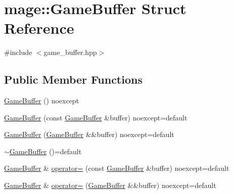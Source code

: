 \hypertarget{structmage_1_1_game_buffer}{}\section{mage\+:\+:Game\+Buffer Struct Reference}
\label{structmage_1_1_game_buffer}


{\ttfamily \#include $<$game\+\_\+buffer.\+hpp$>$}

\subsection*{Public Member Functions}
\begin{DoxyCompactItemize}
\item 
\hyperlink{structmage_1_1_game_buffer_a71c6416a3173fb5016290a622b14bd96}{Game\+Buffer} () noexcept
\item 
\hyperlink{structmage_1_1_game_buffer_ae8f7b5eff3fbabdb1cc44f04cfa69272}{Game\+Buffer} (const \hyperlink{structmage_1_1_game_buffer}{Game\+Buffer} \&buffer) noexcept=default
\item 
\hyperlink{structmage_1_1_game_buffer_a8662856a966635e06583bf3a6420b7c1}{Game\+Buffer} (\hyperlink{structmage_1_1_game_buffer}{Game\+Buffer} \&\&buffer) noexcept=default
\item 
\hyperlink{structmage_1_1_game_buffer_ac1ae097a91a446184b71bb4dd9acf8b4}{$\sim$\+Game\+Buffer} ()=default
\item 
\hyperlink{structmage_1_1_game_buffer}{Game\+Buffer} \& \hyperlink{structmage_1_1_game_buffer_add9fec0aa33f3d3563acd1cb5f9fe9d6}{operator=} (const \hyperlink{structmage_1_1_game_buffer}{Game\+Buffer} \&buffer) noexcept=default
\item 
\hyperlink{structmage_1_1_game_buffer}{Game\+Buffer} \& \hyperlink{structmage_1_1_game_buffer_a46f857f035922fe1beeb5a8f6b59e097}{operator=} (\hyperlink{structmage_1_1_game_buffer}{Game\+Buffer} \&\&buffer) noexcept=default
\end{DoxyCompactItemize}
